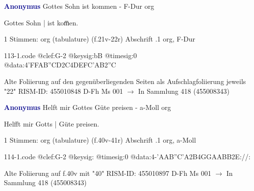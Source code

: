 \documentclass[twocolumn]{book}
\begin{document}
\newline \par \vspace{7pt} \textcolor{darkblue}{\textbf{Anonymus  }}
\newline Gottes Sohn ist kommen - F-Dur
\newline org
\newline \begin{itshape}[f.21v, at left:] Gottes Sohn | ist kom̅en.\end{itshape} 
\newline \textcolor{darkblue}{}  1 Stimmen: org (tabulature)  (f.21v-22r)
\newline Abschrift
.1  org, F-Dur  
\begin{filecontents*}{113-1.code}
@clef:G-2
@keysig:bB
@timesig:0
@data:4'FFAB''CD2C4DEFC'AB2''C
\end{filecontents*}
\newline
%
\newline Alte Foliierung auf den gegenüberliegenden Seiten als Aufschlagfoliierung jeweils "22"
\newline RISM-ID: 455010848
\newline D-Fh  Ms 001
\newline $\rightarrow$ In Sammlung 418 (455008343)
      
\newline \par \vspace{7pt} \textcolor{darkblue}{\textbf{Anonymus  }}
\newline Helft mir Gottes Güte preisen - a-Moll
\newline org
\newline \begin{itshape}[f.40v, at left:] Helfft mir Gotts | Güte preisen.\end{itshape} 
\newline \textcolor{darkblue}{}  1 Stimmen: org (tabulature)  (f.40v-41r)
\newline Abschrift
.1  org, a-Moll  
\begin{filecontents*}{114-1.code}
@clef:G-2
@keysig:
@timesig:0
@data:4-'AAB''C'A2B4GGAABB2E://:
\end{filecontents*}
\newline
%
\newline Alte Foliierung auf f.40v mit "40"
\newline RISM-ID: 455010897
\newline D-Fh  Ms 001
\newline $\rightarrow$ In Sammlung 418 (455008343)
      
\end{document}
